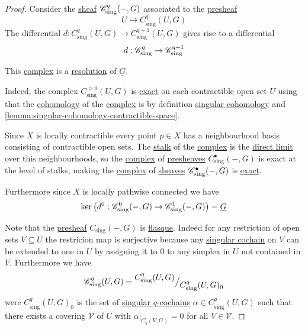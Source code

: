 \documentclass[../../main]{subfiles}
\begin{document}
\begin{proof}
  Consider the \hyperref[def:sheaf]{sheaf} \(\mathscr{C}_{\operatorname{sing}}^{q}(-, G)\) associated to the \hyperref[def:presheaf]{presheaf}
  \begin{equation*}
    U \mapsto C_{\operatorname{sing}}^{q}(U, G)
  \end{equation*}
  The differential \(d: C_{\operatorname{sing}}^{q}(U, G) \to C_{\operatorname{sing}}^{q+1}(U, G)\) gives rise to a differential
  \begin{equation*}
    d: \mathscr{C}_{\operatorname{sing}}^{q} \to \mathscr{C}_{\operatorname{sing}}^{q+1}
  \end{equation*}

  This \hyperref[def:complex]{complex} is a \hyperref[def:resolution]{resolution} of \(\underline{G}\).

  Indeed, the complex \(C_{\operatorname{sing}}^{> 0}(U, G)\) is \hyperref[def:exact-complex]{exact} on each contractible open set \(U\) using that the \hyperref[def:cohomology]{cohomology} of the \hyperref[def:complex]{complex} is by definition \hyperref[def:singular-cohomology]{singular cohomology} and \autoref{lemma:singular-cohomology-contractible-space}.

  Since \(X\) is locally contractible every point \(p \in X\) has a neighbourhood basis consisting of contractible open sets.
  The \hyperref[def:stalk-sheaf]{stalk} of the \hyperref[def:complex]{complex} is the \hyperref[def:direct-limit]{direct limit} over this neighbourhoods, so the \hyperref[def:complex]{complex} of \hyperref[def:presheaf]{presheaves} \(C_{\operatorname{sing}}^{\bullet}(-, G)\) is exact at the level of stalks, making the \hyperref[def:complex]{complex} of \hyperref[def:sheaf]{sheaves} \(\mathscr{C}_{\operatorname{sing}}^{\bullet}(-, G)\) is \hyperref[def:exact-complex]{exact}.

  Furthermore since \(X\) is locally pathwise connected we have
  \begin{equation*}
    \ker \left( d^{0}: \mathscr{C}_{\operatorname{sing}}^{0}(-, G) \to \mathscr{C}_{\operatorname{sing}}^{1}(-, G) \right) = \underline{G}
  \end{equation*}

  Note that the \hyperref[def:presheaf]{presheaf} \(C_{\operatorname{sing}}(-, G)\) is \hyperref[def:flasque-sheaf]{flasque}.
  Indeed for any restriction of open sets \(V \subseteq U\) the restricion map is surjective because any \hyperref[def:singular-cochain]{singular cochain} on \(V\) can be extended to one in \(U\) by assigning it to \(0\) to any simplex in \(U\) not contained in \(V\).
  Furthermore we have
  \begin{equation*}
    \mathscr{C}_{\operatorname{sing}}^{q}(U, G) = {^{\textstyle C_{\operatorname{sing}}^{q}(U, G)}\big/_{\textstyle C_{\operatorname{sing}}^{q}(U, G)_{0}}}
  \end{equation*}
  were \(C_{\operatorname{sing}}^{q}(U, G)_{0}\) is the set of \hyperref[def:singular-cochain]{singular \(q\)-cochains} \(\alpha \in C_{\operatorname{sing}}^{q}(U, G)\) such that there exists a covering \(\mathcal{V}\) of \(U\) with \(\alpha|_{C_{q}(V, G)} = 0\) for all \(V \in \mathcal{V}\).


\end{proof}
\end{document}
